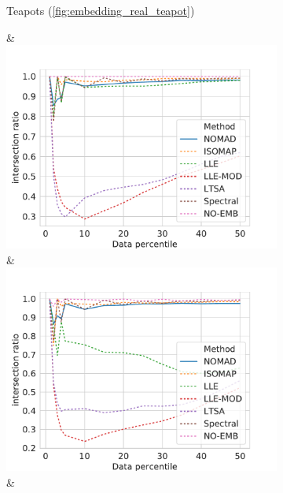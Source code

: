 \documentclass[twoside,11pt]{article}
\begin{document}
\begin{figure}
\begin{subfigure}{\textwidth}
\begin{footnotesize}
\begin{tabu}
    	\begin{sideways}
        	Teapots (\cref{fig:embedding_real_teapot})
        \end{sideways} &
		\includegraphics[width=\linewidth]{figures/geodesics/geodesics_teapot_orthogonal_noise000} &
		\includegraphics[width=\linewidth]{figures/geodesics/geodesics_teapot_orthogonal_noise005} &

\end{tabu}
\end{footnotesize}
\end{subfigure}
\end{figure}
\end{document}
